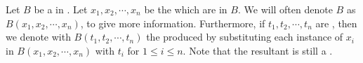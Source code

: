 \begin{rmk}
\label{rmk:FreeVariableNotation}

\rm
    Let $B$ be a \Wff in \scG. 
    Let $x_1, x_2, \cdots, x_n$ be the \IndividualVariables
    which are \FreeVariable in $B$. 
    We will often denote $B$ as
    $B(x_1,x_2, \cdots, x_n)$, to give more information. 
    Furthermore, if $t_1, t_2, \cdots, t_n$ are \Terms, 
    then we denote with 
    $B(t_1, t_2, \cdots, t_n)$ 
    the \String produced by substituting each
    instance of $x_i$ in
    $B(x_1, x_2, \cdots, x_n)$ 
    with $t_i$
    for $1 \leq i \leq n$. 
    Note that the resultant \String is still a \WFF.
\end{rmk}
